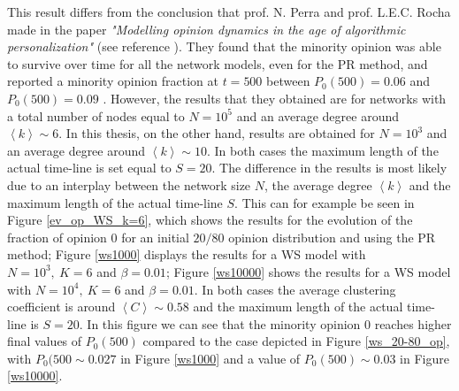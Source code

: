 \documentclass[11 pt , letterpaper , twoside , openright]{book}
\begin{document}
This result differs from the conclusion that prof. N. Perra and prof. L.E.C. Rocha made in the paper \textit{"Modelling opinion dynamics in the age of algorithmic personalization"} (see reference \cite{Perra2019}). They found that the minority opinion was able to survive over time for all the network models, even for the PR method, and reported a minority opinion fraction at $t=500$ between $P_0(500) = 0.06$ and $P_0(500) = 0.09$ \cite{Perra2019}. However, the results that they obtained are for networks with a total number of nodes equal to $N = 10^5$ and an average degree around $\left<k\right> \sim 6$. In this thesis, on the other hand, results are obtained for $N=10^3$ and an average degree around $\left<k\right> \sim 10$. In both cases the maximum length of the actual time-line is set equal to $S=20$. The difference in the results is most likely due to an interplay between the network size $N$, the average degree $\left<k\right>$ and the maximum length of the actual time-line $S$. This can for example be seen in Figure \ref{ev_op_WS_k=6}, which shows the results for the evolution of the fraction of opinion 0 for an initial $20/80$ opinion distribution and using the PR method; Figure \ref{ws1000} displays the results for a WS model with $N=10^3,\ K=6$ and $\beta=0.01$; Figure \ref{ws10000} shows the results for a WS model with $N=10^4,\ K=6$ and $\beta=0.01$. In both cases the average clustering coefficient is around $\left<C\right> \sim 0.58$ and the maximum length of the actual time-line is $S=20$. In this figure we can see that the minority opinion 0 reaches higher final values of $P_0(500)$ compared to the case depicted in Figure \ref{ws_20-80_op}, with $P_0(500 \sim 0.027$ in Figure \ref{ws1000} and a value of $P_0(500) \sim 0.03$ in Figure \ref{ws10000}.
\end{document}
